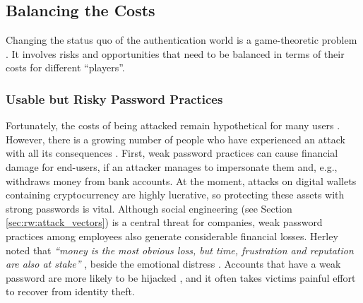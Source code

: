 \subsection{Balancing the Costs}
Changing the status quo of the authentication world is a game-theoretic problem \cite{Bonneau2015ImperfectAuthentication}. It involves risks and opportunities that need to be balanced in terms of their costs for different ``players''. 

\subsubsection{Usable but Risky Password Practices}
Fortunately, the costs of being attacked remain hypothetical for many users \cite{Herley2015Counterfactuals}. However, there is a growing number of people who have experienced an attack with all its consequences \cite{BKA2016Bundeslagebild}. 
First, weak password practices can cause financial damage for end-users, if an attacker manages to impersonate them and, e.g., withdraws money from bank accounts. At the moment, attacks on digital wallets containing cryptocurrency are highly lucrative, so protecting these assets with strong passwords is vital. Although social engineering (see Section \ref{sec:rw:attack_vectors}) is a central threat for companies, weak password practices among employees also generate considerable financial losses. 
Herley \etal noted that \textit{``money is the most obvious loss, but time, frustration and reputation are also at stake''} \cite{Herley2012PersistenceOfPasswords}, beside the emotional distress \cite{Shay2014ReligiousAunt}. Accounts that have a weak password are more likely to be hijacked \cite{Wang2016TargetedGuessingUnderestimated}, and it often takes victims painful effort to recover from identity theft.

